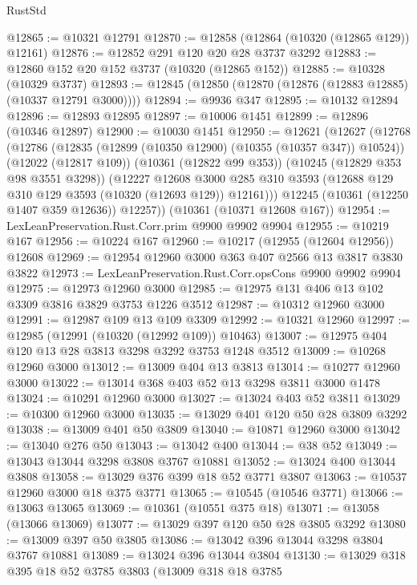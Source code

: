 \begin{lexlean}{RustStd}
\begin{coremodule}
@12865 := @10321 @12791
@12870 := @12858 (@12864 (@10320 (@12865 @129)) @12161)
@12876 := @12852 @291 @120 @20 @28 @3737 @3292
@12883 := @12860 @152 @20 @152 @3737 (@10320 (@12865 @152))
@12885 := @10328 (@10329 @3737)
@12893 := @12845 (@12850 (@12870 (@12876 (@12883 @12885) (@10337 @12791 @3000))))
@12894 := @9936 @347
@12895 := @10132 @12894
@12896 := @12893 @12895
@12897 := @10006 @1451
@12899 := @12896 (@10346 @12897)
@12900 := @10030 @1451
@12950 := @12621
    (@12627
      (@12768
        (@12786
          (@12835 (@12899 (@10350 @12900) (@10355 (@10357 @347)) @10524))
          (@12022 (@12817 @109))
          (@10361 (@12822 @99 @353))
          (@10245 (@12829 @353 @98 @3551 @3298))
          (@12227
            @12608
            @3000
            @285
            @310
            @3593
            (@12688 @129 @310 @129 @3593 (@10320 (@12693 @129)) @12161)))
        @12245
        (@10361 (@12250 @1407 @359 @12636))
        @12257))
    (@10361 (@10371 @12608 @167))
@12954 := LexLeanPreservation.Rust.Corr.prim @9900 @9902 @9904
@12955 := @10219 @167
@12956 := @10224 @167
@12960 := @10217 (@12955 (@12604 @12956)) @12608
@12969 := @12954 @12960 @3000 @363 @407 @2566 @13 @3817 @3830 @3822
@12973 := LexLeanPreservation.Rust.Corr.opsCons @9900 @9902 @9904
@12975 := @12973 @12960 @3000
@12985 := @12975 @131 @406 @13 @102 @3309 @3816 @3829 @3753 @1226 @3512
@12987 := @10312 @12960 @3000
@12991 := @12987 @109 @13 @109 @3309
@12992 := @10321 @12960
@12997 := @12985 (@12991 (@10320 (@12992 @109)) @10463)
@13007 := @12975 @404 @120 @13 @28 @3813 @3298 @3292 @3753 @1248 @3512
@13009 := @10268 @12960 @3000
@13012 := @13009 @404 @13 @3813
@13014 := @10277 @12960 @3000
@13022 := @13014 @368 @403 @52 @13 @3298 @3811 @3000 @1478
@13024 := @10291 @12960 @3000
@13027 := @13024 @403 @52 @3811
@13029 := @10300 @12960 @3000
@13035 := @13029 @401 @120 @50 @28 @3809 @3292
@13038 := @13009 @401 @50 @3809
@13040 := @10871 @12960 @3000
@13042 := @13040 @276 @50
@13043 := @13042 @400
@13044 := @38 @52
@13049 := @13043 @13044 @3298 @3808 @3767 @10881
@13052 := @13024 @400 @13044 @3808
@13058 := @13029 @376 @399 @18 @52 @3771 @3807
@13063 := @10537 @12960 @3000 @18 @375 @3771
@13065 := @10545 (@10546 @3771)
@13066 := @13063 @13065
@13069 := @10361 (@10551 @375 @18)
@13071 := @13058 (@13066 @13069)
@13077 := @13029 @397 @120 @50 @28 @3805 @3292
@13080 := @13009 @397 @50 @3805
@13086 := @13042 @396 @13044 @3298 @3804 @3767 @10881
@13089 := @13024 @396 @13044 @3804
@13130 := @13029
    @318
    @395
    @18
    @52
    @3785
    @3803
    (@13009
      @318
      @18
      @3785

\end{coremodule}
\end{lexlean}
